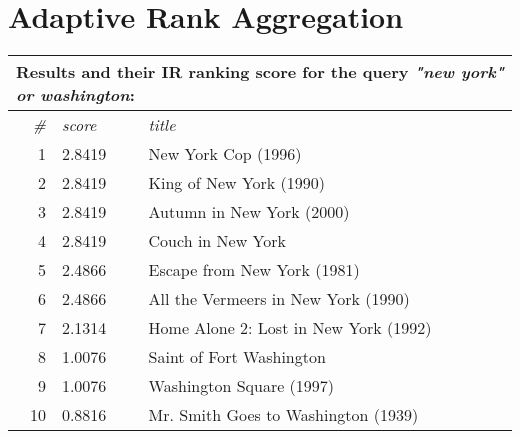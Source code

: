 \section{Adaptive Rank Aggregation}

\begin{table}[h]
  \centering 

  \begin{tabular*}{0.9\textwidth}{ r l p{8cm} }
    \multicolumn{3}{l}{Results and their IR ranking score for the query \emph{"new york" or washington}:}\\
    \toprule
    \emph{\#} & \emph{score} & \emph{title}\\
    \midrule
    1 & 2.8419  &  New York Cop (1996)                    \\
    2 & 2.8419  &  King of New York (1990)                \\
    3 & 2.8419  &  Autumn in New York (2000)              \\
    4 & 2.8419  &  Couch in New York                      \\
    5 & 2.4866  &  Escape from New York (1981)            \\
    6 & 2.4866  &  All the Vermeers in New York (1990)    \\
    7 & 2.1314  &  Home Alone 2: Lost in New York (1992)  \\
    8 & 1.0076  &  Saint of Fort Washington               \\
    9 & 1.0076  &  Washington Square (1997)               \\
    10& 0.8816  &  Mr. Smith Goes to Washington (1939)    \\
    \bottomrule
  \end{tabular*}

  \vspace{1em} 


\end{table}
